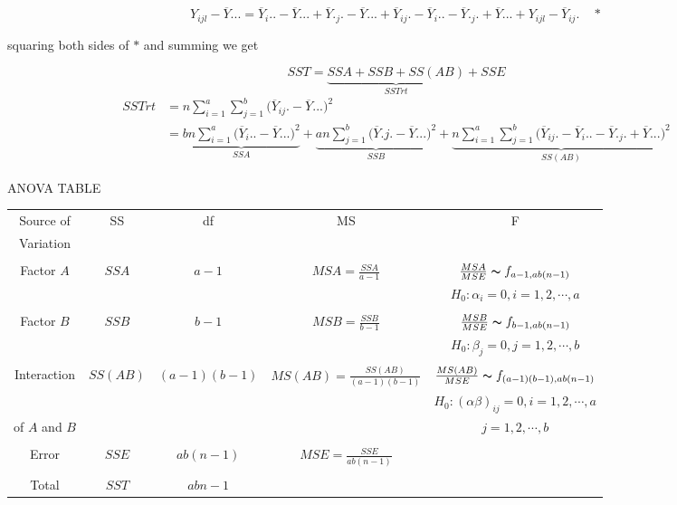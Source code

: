 \documentclass[11pt,a4paper]{article}
\theoremstyle{definition}
\begin{document}
$$Y_{ijl} -\overline{Y}... = \overline{Y}_i..-\overline{Y}...+\overline{Y}._j.-\overline{Y}...+\overline{Y}_{ij}.-\overline{Y}_i..-\overline{Y}._j.+\overline{Y}...+Y_{ijl}-\overline{Y}_{ij}.\quad  *$$

squaring both sides of $*$ and summing we get 

$$SST = \underbrace{SSA + SSB + SS(AB)}_{SSTrt}+SSE$$
\begin{align*}
SSTrt & = n\sum^a_{i=1}\sum^b_{j=1}\big(\overline{Y}_{ij}.-\overline{Y}...\big)^2\\
      & = \underbrace{bn\sum^a_{i=1}\big(\overline{Y}_i..-\overline{Y}...\big)^2}_{SSA}+\underbrace{an\sum^b_{j=1}\big(\overline{Y}.j.-\overline{Y}...\big)^2}_{SSB}+ \underbrace{n\sum^a_{i=1}\sum^b_{j=1}\big(\overline{Y}_{ij}.-\overline{Y}_i..-\overline{Y}._j.+\overline{Y}...\big)^2}_{SS(AB)}
\end{align*}


\begin{table}[H]
\centering
ANOVA TABLE\\
\begin{tabular}{|c|c|c|c|c|}
\hline
Source of & SS & df & MS & F \\
Variation &&&&\\
\hline
&&&&\\
Factor $A$ & $SSA$ & $a-1$ & $MSA = \frac{SSA}{a-1}$ & $\frac{MSA}{MSE}\thicksim f_{a-1,ab(n-1)}$\\
&&&& $H_0:\alpha_i=0, i=1,2,\cdots,a$\\
&&&&\\
Factor $B$ & $SSB$ & $b-1$ & $MSB=\frac{SSB}{b-1}$ & $\frac{MSB}{MSE}\thicksim f_{b-1,ab(n-1)}$\\
&&&& $H_0:\beta_j=0, j=1,2,\cdots,b$\\
&&&&\\
Interaction & $SS(AB)$ & $(a-1)(b-1)$ & $MS(AB)=\frac{SS(AB)}{(a-1)(b-1)}$ & $\frac{MS(AB)}{MSE}\thicksim f_{(a-1)(b-1),ab(n-1)}$\\
&&&& $H_0:(\alpha\beta)_{ij}=0, i=1,2,\cdots,a$\\
of $A$ and $B$ &&&& $j=1,2,\cdots,b$\\
&&&&\\
Error & $SSE$ & $ab(n-1)$ & $MSE=\frac{SSE}{ab(n-1)}$ &\\
&&&&\\
\hline
Total & $SST$ & $abn-1$ &&\\
\hline 
\end{tabular}
\end{table}
\end{document}
